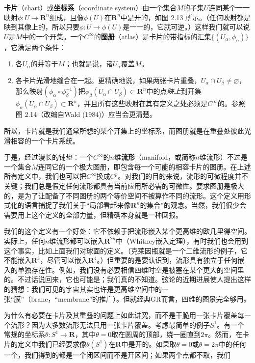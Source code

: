 \textbf{卡片}（chart）或\textbf{坐标系}（coordinate system）由一个集合$M$的子集$U$连同某个一一映射$\phi:U\to\mathbf{R}^n$组成，且像$\phi(U)$在$\mathbf{R}^n$中是开的，如图 2.13 所示。（任何映射都是映到其像上的，所以只要$\phi:U\to\phi(U)$是一一的，它就可逆。）这样我们就可以说$U$是$M$中的一个开集。一个$C^\infty$的\textbf{图册}（atlas）是卡片的带指标的汇集$\{(U_\alpha,\phi_\alpha)\}$，它满足两个条件：
\begin{enumerate}
\item 各$U_\alpha$的并等于$M$；也就是说，诸$U_\alpha$覆盖$M$。
\item 各卡片光滑地缝合在一起。更精确地说，如果两张卡片重叠，$U_\alpha\cap U_\beta\neq\varnothing$，那么映射$(\phi_\alpha\circ\phi_\beta^{-1})$把$\phi_\beta(U_\alpha\cap U_\beta)\subset\mathbf{R}^n$中的点\emph{映上}到开集$\phi_\alpha(U_\alpha\cap U_\beta)\subset\mathbf{R}^n$，并且所有这些映射在其有定义之处必须是$C^\infty$的。参照图 2.14（改编自Wald (1984)）应当会更清楚。
\end{enumerate}
所以，卡片就是我们通常所想的某个开集上的坐标系，而图册就是在重叠处彼此光滑相容的一个卡片系统。



于是，经过漫长的铺垫：一个$C^\infty$的$n$维\textbf{流形}（manifold，或简称$n$维流形）不过是一个集合$M$连同它的一个极大图册，即包含每一个可能的相容卡片的图册。在上述所有定义中，我们也可以把$C^\infty$换成$C^p$。对我们的目的来说，流形的可微程度并不关键；我们总是假定任何流形都具有当前应用所必需的可微性。要求图册是极大的，是为了让配备了不同图册的两个等价空间不被算作不同的流形。这个定义用形式化的语言捕捉了我们关于“局部看起来像$\mathbf{R}^n$的集合”的观念。当然，我们很少会需要用上这个定义的全部力量，但精确本身就是一种回报。

我们的这个定义有一个好处：它不依赖于把流形嵌入某个更高维的欧几里得空间。实际上，任何$n$维流形都可以嵌入$\mathbf{R}^{2n}$中（Whitney嵌入定理），有时我们也会用到这个事实，比如上面我们对球面的定义。（克莱因瓶就是一个二维流形的例子，它不能嵌入$\mathbf{R}^3$，尽管可以嵌入$\mathbf{R}^4$。）但重要的是要认识到，流形具有独立于任何嵌入的单独存在性。例如，我们没有必要相信四维时空是被塞在某个更大的空间里的。不过话说回来，它也可能是；我们真的不知道。弦论的近期进展使人提出这样的猜想：我们可见的宇宙其实也许是更高维空间中的一张“膜”（brane，“membrane”的推广）。但就经典GR而言，四维的图景完全够用。

为什么有必要在卡片及其重叠的问题上如此讲究，而不是干脆用一张卡片覆盖每一个流形？因为大多数流形无法只用一张卡片覆盖。考虑最简单的例子$S^1$。有一个常规的坐标系$\theta:S^1\to\mathbf{R}$，其中$\theta=0$取在圆周的顶部，绕一圈直到$2\pi$。然而，在卡片的定义中我们已经要求像$\theta(S^1)$在$\mathbf{R}$中是开的。如果取$\theta=0$或$\theta=2\pi$中的任何一个，我们得到的都是一个闭区间而不是开区间；如果两个点都不取，我们
